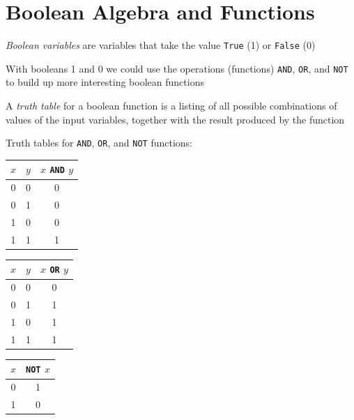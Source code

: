 \documentclass[8pt,a4paper,compress]{beamer}
\begin{document}
\section{Boolean Algebra and Functions}
\begin{frame}[fragile]
\emph{Boolean variables} are variables that take the value \lstinline{True} (1) or \lstinline{False} (0)

\bigskip

With booleans 1 and 0 we could use the operations (functions) \lstinline{AND}, \lstinline{OR}, and \lstinline{NOT} to build up more interesting boolean functions

\bigskip

A \emph{truth table} for a boolean function is a listing of all possible combinations of values of the input variables, together with the result produced by the function

\bigskip

Truth tables for \lstinline{AND}, \lstinline{OR}, and \lstinline{NOT} functions:

\begin{center}
\begin{tabular}{cc|c}
$x$ & $y$ & $x$ \lstinline$AND$ $y$ \\ \hline
0 & 0 & 0 \\
0 & 1 & 0 \\
1 & 0 & 0 \\
1 & 1 & 1
\end{tabular}\hspace{1cm} \begin{tabular}{cc|c}
$x$ & $y$ & $x$ \lstinline$OR$ $y$ \\ \hline
0 & 0 & 0 \\
0 & 1 & 1 \\
1 & 0 & 1 \\
1 & 1 & 1
\end{tabular}\hspace{1cm} \begin{tabular}{c|c}
$x$ & \lstinline$NOT$ $x$ \\ \hline
0 & 1 \\
1 & 0
\end{tabular}
\end{center}
\end{frame}
\end{document}
